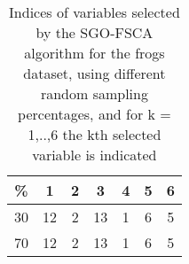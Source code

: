 \begin{table}
	\begin{center}
		\begin{tabular}{c c c c c c c}
			\% & 1 & 2 & 3 & 4 & 5 & 6 \\
			\hline
			30 & 12 & 2 & 13 & 1 & 6 & 5 \\
			70 & 12 & 2 & 13 & 1 & 6 & 5 \\
		\end{tabular}
	\end{center}
	\caption{Indices of variables selected by the SGO-FSCA algorithm for the frogs dataset, using different random sampling percentages, and for k = 1,..,6 the kth selected variable is indicated}
\end{table}